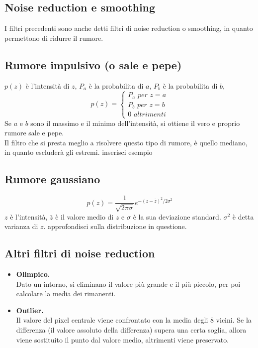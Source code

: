 \documentclass{report}
\begin{document}
	\subsection{Noise reduction e smoothing}
	I filtri precedenti sono anche detti filtri di noise reduction o smoothing, in quanto permettono di ridurre il rumore.
	
	\subsection{Rumore impulsivo (o sale e pepe)}
	$p(z)$ è l'intensità di $z$, $P_a$ è la probabilita di $a$, $P_b$ è la probabilita di $b$, 
	$$
	p(z) = \begin{cases}
	P_a \textit{ per }z=a \\
	P_b \textit{ per }z=b \\
	0 \textit{ altrimenti}
	\end{cases}
	$$
	Se $a$ e $b$ sono il massimo e il minimo dell'intensità, si ottiene il vero e proprio rumore sale e pepe.\\
	Il filtro che si presta meglio a risolvere questo tipo di rumore, è quello mediano, in quanto escluderà gli estremi.
	inserisci esempio
	\subsection{Rumore gaussiano}
	
	$$
	p(z) = \frac{1}{\sqrt{2 \pi \sigma}}e^{-(z-\bar{z})^2/2\sigma^2}
	$$
	$z$ è l'intensità, $\bar{z}$ è il valore medio di $z$ e $\sigma$ è la sua deviazione standard. $\sigma^2$ è detta varianza di $z$. approfondisci sulla distribuzione in questione.
	\subsection{Altri filtri di noise reduction}
	\begin{itemize}
		\item \textbf{Olimpico.}\\
		      Dato un intorno, si eliminano il valore più grande e il più piccolo, per poi calcolare la media dei rimanenti.
		\item \textbf{Outlier.}\\
		      Il valore del pixel centrale viene confrontato con la media degli 8 vicini. Se la differenza (il valore assoluto della differenza) supera una certa soglia, allora viene sostituito il punto dal valore medio, altrimenti viene preservato.
	\end{itemize}
	
\end{document}
